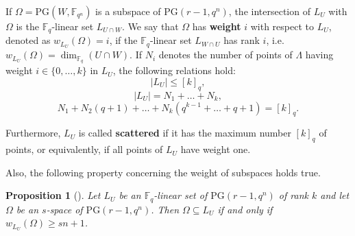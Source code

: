\documentclass[11pt]{amsart}
\newtheorem{proposition}[theorem]{Proposition}
\newcommand{\fqn}{\mathbb{F}_{q^n}}
\newcommand{\F}{{\mathbb F}}
\newcommand{\fq}{{\mathbb F}_{q}}
\newcommand{\PG}{\mathrm{PG}}
\begin{document}
If $\Omega=\PG(W,\F_{q^n})$ is a subspace of $\PG(r-1,q^n)$, the intersection of $L_U$ with $\Omega$ is the $\F_q$-linear set $L_{U \cap W}$. 
We say that $\Omega$ has \textbf{weight} $i$ with respect to $L_U$, denoted as $w_{L_U}(\Omega) = i$, if the $\F_q$-linear set $L_{W \cap U}$ has rank $i$, i.e.\ $w_{L_U}(\Omega) = \dim_{\F_q}(U \cap W)$.
If $N_i$ denotes the number of points of $\Lambda$ having weight $i\in \{0,\ldots,k\}$  in $L_U$, the following relations hold:
\begin{equation}\label{eq:card}
    |L_U| \leq [k]_q,
\end{equation}
\begin{equation}\label{eq:pesicard}
    |L_U| =N_1+\ldots+N_k,
\end{equation}
\begin{equation}\label{eq:pesivett}
    N_1+N_2(q+1)+\ldots+N_k(q^{k-1}+\ldots+q+1)=[k]_q.
\end{equation}

Furthermore, $L_U$ is called \textbf{scattered} if it has the maximum number $[k]_q$  of points, or equivalently, if all points of $L_U$ have weight one.

Also, the following property concerning the weight of subspaces holds true.

\begin{proposition}[{\cite[Property 2.3]{polverino2010linear}}]
\label{prop:containingsubspace}
Let $L_U$ be an $\F_q$-linear set of $\PG(r-1,q^n)$ of rank $k$ and let $\Omega$ be an $s$-space of $\PG(r-1,q^n)$.
Then $\Omega \subseteq L_U$ if and only if $w_{L_U}(\Omega) \geq sn+1$.
\end{proposition}

\end{document}
